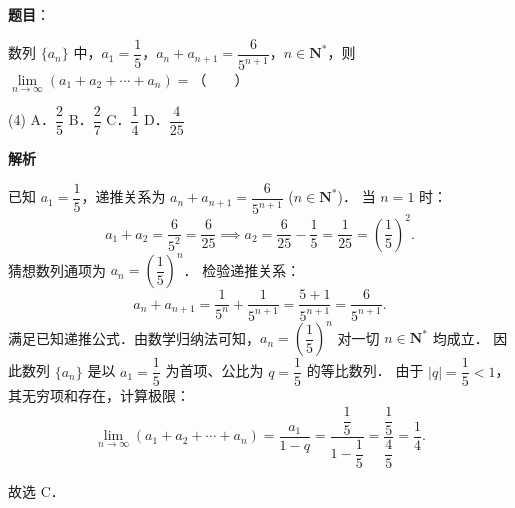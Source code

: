 \begin{answer}

\textbf{题目}：

数列 $\{a_n\}$ 中，$a_1 = \dfrac{1}{5}$，$a_n + a_{n+1} = \dfrac{6}{5^{n+1}}$，$n \in \mathbf{N}^*$，则 $\lim\limits_{n \to \infty} (a_1 + a_2 + \cdots + a_n) =$\mbox{（　　）}

\begin{gkopts}(4)
\task A．$\dfrac{2}{5}$
\task B．$\dfrac{2}{7}$
\task C．$\dfrac{1}{4}$
\task D．$\dfrac{4}{25}$
\end{gkopts}

\textbf{解析}

已知 $a_1 = \dfrac{1}{5}$，递推关系为 $a_n + a_{n+1} = \dfrac{6}{5^{n+1}}$ ($n \in \mathbf{N}^*$)．
当 $n = 1$ 时：
\nopagebreak[4]
\[
a_1 + a_2 = \frac{6}{5^2} = \frac{6}{25} \implies a_2 = \frac{6}{25} - \frac{1}{5} = \frac{1}{25} = \left(\frac{1}{5}\right)^2.
\]
猜想数列通项为 $a_n = \left(\dfrac{1}{5}\right)^n$．
检验递推关系：
\nopagebreak[4]
\[
a_n + a_{n+1} = \frac{1}{5^n} + \frac{1}{5^{n+1}} = \frac{5 + 1}{5^{n+1}} = \frac{6}{5^{n+1}}.
\]
满足已知递推公式．由数学归纳法可知，$a_n = \left(\dfrac{1}{5}\right)^n$ 对一切 $n \in \mathbf{N}^*$ 均成立．
因此数列 $\{a_n\}$ 是以 $a_1 = \dfrac{1}{5}$ 为首项、公比为 $q = \dfrac{1}{5}$ 的等比数列．
由于 $|q| = \dfrac{1}{5} < 1$，其无穷项和存在，计算极限：
\nopagebreak[4]
\[
\lim_{n \to \infty} (a_1 + a_2 + \cdots + a_n) = \frac{a_1}{1 - q} = \frac{\dfrac{1}{5}}{1 - \dfrac{1}{5}} = \frac{\dfrac{1}{5}}{\dfrac{4}{5}} = \frac{1}{4}.
\]

故选 C．


\end{answer}
